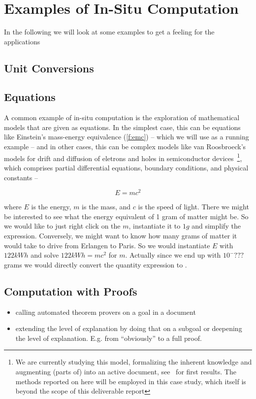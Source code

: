 \section{Examples of In-Situ Computation}\label{sec:examples}

In the following we will look at some examples to get a feeling for the applications
\subsection{Unit Conversions}\label{sec:units}

\subsection{Equations}\label{sec:equations}

A common example of in-situ computation is the exploration of mathematical models that are
given as equations. In the simplest case, this can be equations like Einstein's
mass-energy equivalence (\ref{f:emc}) -- which we will use as a running example -- and in
other cases, this can be complex models like van Roosbroeck's models for drift and
diffusion of eletrons and holes in semiconductor devices~\cite{Kopruckietal}\footnote{We
  are currently studying this model, formalizing the inherent knowledge and augmenting
  (parts of) \cite{Kopruckietal} into an active document, see~\cite{KohKopMueTab:RCS} for
    first results. The methods reported on here will be employed in this case study, which
    itself is beyond the scope of this deliverable report}, which comprises partial
  differential equations, boundary conditions, and physical constants --

\begin{equation}\label{f:emc}
  E=mc^2
\end{equation}

where $E$ is the energy, $m$ is the mass, and $c$ is the speed of light. There we might be
interested to see what the energy equivalent of 1 gram of matter might be. So we would
like to just right click on the $m$, instantiate it to $1g$ and simplify the
expression. Conversely, we might want to know how many grams of matter it would take to
drive from Erlangen to Paris. So we would instantiate $E$ with $122 kWh$ and solve
$122kWh=mc^2$ for $m$. Actually since we end up with $10^-{???}$ grams we would directly
convert the quantity expression to .

\subsection{Computation with Proofs}
\begin{itemize}
  \item calling automated theorem provers on a goal in a document
  \item extending the level of explanation by doing that on a subgoal or deepening the
    level of explanation. E.g. from ``obviously'' to a full proof.  
  \end{itemize}


